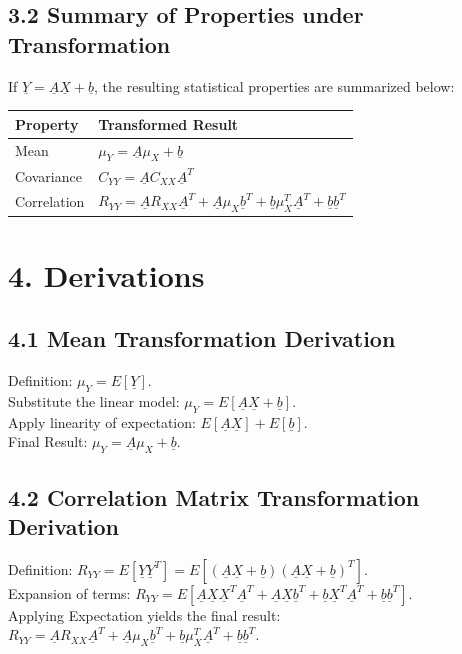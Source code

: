 \documentclass[12pt]{article}
\begin{document}
\subsection*{3.2 Summary of Properties under Transformation}
If $\underline{Y}=\underline{A}\underline{X}+\underline{b}$, the resulting statistical properties are summarized below:

\vspace{0.5cm}
\begin{tabular}{|l|l|}
\hline
\textbf{Property} & \textbf{Transformed Result} \\
\hline
Mean & $\mu_{Y}=\underline{A}\mu_{X}+\underline{b}$ \\
\hline
Covariance & $C_{YY}=\underline{A}C_{XX}\underline{A}^{T}$ \\
\hline
Correlation & $R_{YY}=\underline{A}R_{XX}\underline{A}^{T}+\underline{A}\mu_{X}\underline{b}^{T}+\underline{b}\mu_{X}^{T}\underline{A}^{T}+\underline{b}\underline{b}^{T}$ \\
\hline
\end{tabular}
\vspace{0.5cm}

\section*{4. Derivations}
\subsection*{4.1 Mean Transformation Derivation}
Definition: $\mu_{Y}=E[\underline{Y}]$. \\
Substitute the linear model: $\mu_{Y}=E[\underline{A}\underline{X}+\underline{b}]$. \\
Apply linearity of expectation: $E[\underline{A}\underline{X}]+E[\underline{b}]$. \\
Final Result: $\mu_{Y}=\underline{A}\mu_{X}+\underline{b}$.

\subsection*{4.2 Correlation Matrix Transformation Derivation}
Definition: $R_{YY}=E[\underline{Y}\underline{Y}^{T}] = E[(\underline{A}\underline{X}+\underline{b})(\underline{A}\underline{X}+\underline{b})^{T}]$. \\
Expansion of terms: $R_{YY}=E[\underline{A}\underline{X}\underline{X}^{T}\underline{A}^{T}+\underline{A}\underline{X}\underline{b}^{T}+\underline{b}\underline{X}^{T}\underline{A}^{T}+\underline{b}\underline{b}^{T}]$. \\
Applying Expectation yields the final result: $R_{YY}=\underline{A}R_{XX}\underline{A}^{T}+\underline{A}\mu_{X}\underline{b}^{T}+\underline{b}\mu_{X}^{T}\underline{A}^{T}+\underline{b}\underline{b}^{T}$.
\end{document}
